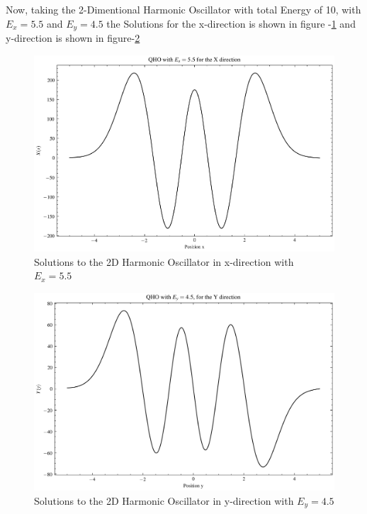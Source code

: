 \documentclass{article}
\begin{document}
\begin{multicols}{2}
Now, taking the 2-Dimentional Harmonic Oscillator with total Energy of 10, with $E_x = 5.5$ and $E_y = 4.5$ the Solutions for the x-direction is shown in figure -\ref{2dex} and y-direction is shown in figure-\ref{2dey}

\begin{figure}[H]
    \centering
    \includegraphics[width = \columnwidth]{Images/2dex.png}
    \caption{Solutions to the 2D Harmonic Oscillator in x-direction with $E_x = 5.5$}
    \label{2dex}
\end{figure}

\begin{figure}[H]
    \centering
    \includegraphics[width = \columnwidth]{Images/2dey.png}
    \caption{Solutions to the 2D Harmonic Oscillator in y-direction with $E_y = 4.5$}
    \label{2dey}
\end{figure}




\end{multicols}
\end{document}
